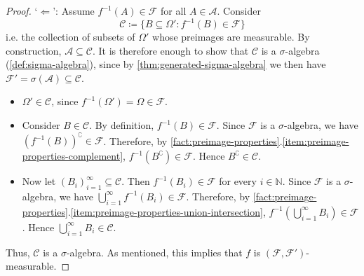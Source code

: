 \begin{proof}
`$\Leftarrow$':
%
%
%
Assume $f^{-1}(A) \in \mathcal{F}$ for all $A \in \mathcal{A}$.
Consider
\[
\mathcal{C} 
\coloneq
\{B \subseteq \Omega' : f^{-1}(B) \in \mathcal{F}\}
\]
i.e. the collection of subsets of $\Omega'$ whose pre\-images are measurable.
By construction, $\mathcal{A} \subseteq \mathcal{C}$.
It is therefore enough to show that $\mathcal{C}$ is a $\sigma$-algebra (\autoref{def:sigma-algebra}), since by \autoref{thm:generated-sigma-algebra} we then have $\mathcal{F}' = \sigma(\mathcal{A}) \subseteq \mathcal{C}$.
\begin{itemize}
\item 
$\Omega' \in \mathcal{C}$, since $f^{-1}(\Omega') = \Omega \in \mathcal{F}$.
\cmark
\item
Consider $B \in \mathcal{C}$.
By definition, $f^{-1}(B) \in \mathcal{F}$.
Since $\mathcal{F}$ is a $\sigma$-algebra, we have $(f^{-1}(B))^{\complement} \in \mathcal{F}$.
Therefore, by \autoref{fact:preimage-properties}.\ref{item:preimage-properties-complement}, $f^{-1}(B^{\complement}) \in \mathcal{F}$.
Hence $B^{\complement} \in \mathcal{C}$.
\cmark
\item
Now let $(B_i)_{i=1}^{\infty} \subseteq \mathcal{C}$.
Then $f^{-1}(B_i) \in \mathcal{F}$ for every $i \in \mathbb{N}$.
Since $\mathcal{F}$ is a $\sigma$-algebra, we have $\bigcup_{i=1}^{\infty} f^{-1}(B_i) \in \mathcal{F}$.
Therefore, by \autoref{fact:preimage-properties}.\ref{item:preimage-properties-union-intersection}, $f^{-1}(\bigcup_{i=1}^{\infty} B_i) \in \mathcal{F}$.
Hence $\bigcup_{i=1}^{\infty} B_i \in \mathcal{C}$.
\cmark
\end{itemize}
Thus, $\mathcal{C}$ is a $\sigma$-algebra.
As mentioned, this implies that 
$f$ is $(\mathcal{F}, \mathcal{F}')$-measurable.
\end{proof}


